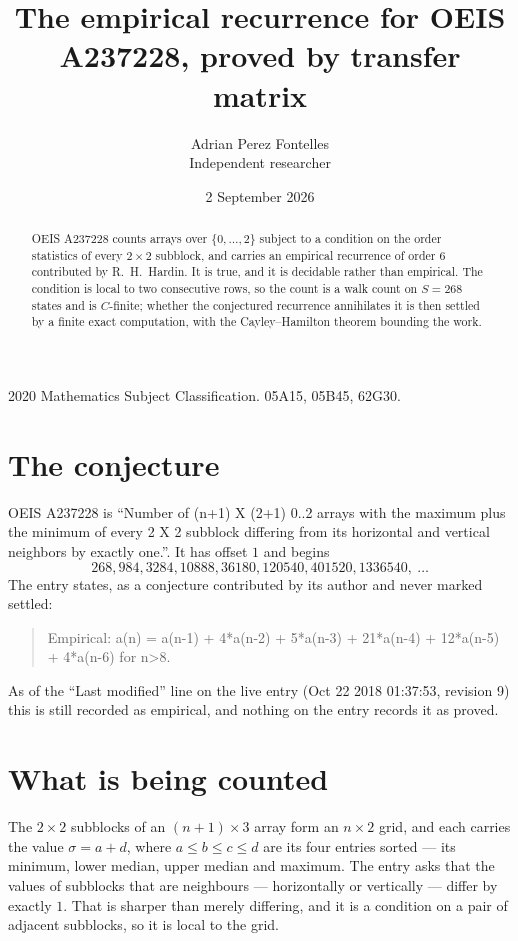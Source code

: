 \documentclass[11pt,a4paper]{article}
\title{The empirical recurrence for OEIS A237228, proved by transfer matrix}
\author{Adrian Perez Fontelles\\ \small Independent researcher}
\date{2 September 2026}
\theoremstyle{plain}
\theoremstyle{definition}
\begin{document}
\maketitle

\begin{abstract}
OEIS A237228 counts arrays over $\{0,\dots,2\}$ subject to a condition on the order
statistics of every $2\times2$ subblock, and carries an empirical recurrence of order
$6$ contributed by R.~H.~Hardin. It is true, and it is decidable rather than empirical.
The condition is local to two consecutive rows, so the count is a walk count on $S=268$
states and is $C$-finite; whether the conjectured recurrence annihilates it is then settled by
a finite exact computation, with the Cayley--Hamilton theorem bounding the work.
\end{abstract}

\noindent\small 2020 Mathematics Subject Classification. 05A15, 05B45, 62G30.\normalsize

\section{The conjecture}

OEIS A237228 is ``Number of (n+1) X (2+1) 0..2 arrays with the maximum plus the minimum of every 2 X 2 subblock differing from its horizontal and vertical neighbors by exactly one.''. It has offset $1$ and begins
\[
268, 984, 3284, 10888, 36180, 120540, 401520, 1336540,\ \dots
\]
The entry states, as a conjecture contributed by its author and never marked settled:
\begin{quote}
Empirical: a(n) = a(n-1) + 4*a(n-2) + 5*a(n-3) + 21*a(n-4) + 12*a(n-5) + 4*a(n-6) for n>8.
\end{quote}
As of the ``Last modified'' line on the live entry (Oct 22 2018 01:37:53, revision 9) this is still
recorded as empirical, and nothing on the entry records it as proved.

\section{What is being counted}

The $2\times2$ subblocks of an $(n+1)\times3$ array form an
$n\times2$ grid, and each carries the value $\sigma=a+d$, where $a\le b\le c\le d$ are its four entries sorted --- its minimum, lower median, upper median and maximum. The entry asks that the values of
subblocks that are neighbours --- horizontally or vertically --- differ by exactly $1$.
That is sharper than merely differing, and it is a condition on a pair of adjacent subblocks,
so it is local to the grid.
\end{document}
